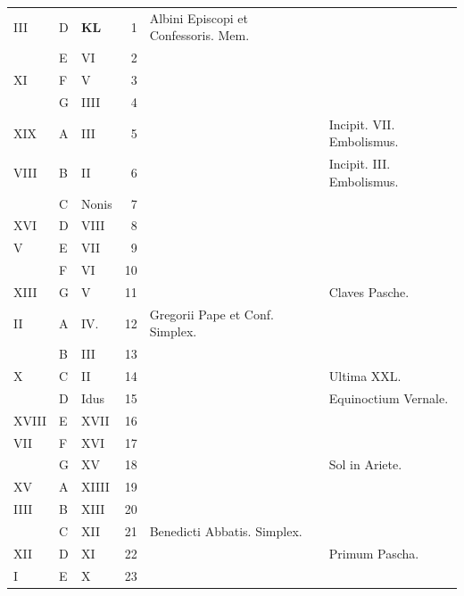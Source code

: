 \documentclass[11pt,openany]{book}
\begin{document}
\begin{center}
\begin{tabular}{l | l | l | r | l l}
\color{Red} III & D & \textbf{\color{Red} K\color{Blue}L} & 1 & \color{Red} Albini Episcopi et Confessoris. Mem. \\
\color{Red}  & E & \color{Red} VI & 2 & & \color{Red} \\
\color{Red} XI & F & \color{Red} V & 3 & \\
\color{Red}  & G & \color{Red} IIII & 4 & & \color{Red} \\
\color{Red} XIX & \color{Red} A & \color{Red} III & 5 & & \color{Red} Incipit. VII. Embolismus. \\
\color{Red} VIII & B & \color{Red} II & 6 & & \color{Red} Incipit. III. Embolismus. \\
\color{Red}  & C & \color{Red} Nonis & 7 & & \color{Red} \\
\color{Red} XVI & D & \color{Red} VIII & 8 & & \color{Red} \\
\color{Red} V & E & \color{Red} VII & 9 & & \color{Red} \\
\color{Red}  & F & \color{Red} VI & 10 & & \color{Red} \\
\color{Red} XIII & G & \color{Red} V & 11 & & \color{Red} Claves Pasche. \\
\color{Red} II & \color{Red} A & \color{Red} IV. & 12 & \color{Red} Gregorii Pape et Conf. Simplex. \\
\color{Red}  & B & \color{Red} III & 13 & & \color{Red} \\
\color{Red} X & C & \color{Red} II & 14 & & \color{Red} Ultima XXL. \\
\color{Red}  & D & \color{Red} Idus & 15 & & \color{Red} Equinoctium Vernale. \\
\color{Red} XVIII & E & \color{Red} XVII & 16 & \\
\color{Red} VII & F & \color{Red} XVI & 17 & & \color{Red} \\
\color{Red}  & G & \color{Red} XV & 18 & & \color{Red} Sol in Ariete. \\
\color{Red} XV & \color{Red} A & \color{Red} XIIII & 19 & & \color{Red} \\
\color{Red} IIII & B & \color{Red} XIII & 20 & & \color{Red} \\
\color{Red}  & C & \color{Red} XII & 21 & \color{Red} Benedicti Abbatis. Simplex. \\
\color{Red} XII & D & \color{Red} XI & 22 & & \color{Red} Primum Pascha. \\
\color{Red} I & E & \color{Red} X & 23 & & \color{Red} \\

\end{tabular}
\end{center}
\end{document}
